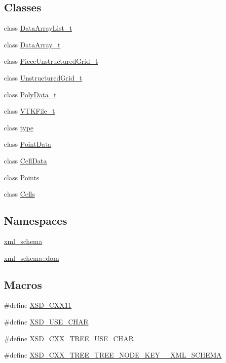 \subsection*{Classes}
\begin{DoxyCompactItemize}
\item 
class \hyperlink{classDataArrayList__t}{Data\+Array\+List\+\_\+t}
\item 
class \hyperlink{classDataArray__t}{Data\+Array\+\_\+t}
\item 
class \hyperlink{classPieceUnstructuredGrid__t}{Piece\+Unstructured\+Grid\+\_\+t}
\item 
class \hyperlink{classUnstructuredGrid__t}{Unstructured\+Grid\+\_\+t}
\item 
class \hyperlink{classPolyData__t}{Poly\+Data\+\_\+t}
\item 
class \hyperlink{classVTKFile__t}{V\+T\+K\+File\+\_\+t}
\item 
class \hyperlink{classtype}{type}
\item 
class \hyperlink{classPointData}{Point\+Data}
\item 
class \hyperlink{classCellData}{Cell\+Data}
\item 
class \hyperlink{classPoints}{Points}
\item 
class \hyperlink{classCells}{Cells}
\end{DoxyCompactItemize}
\subsection*{Namespaces}
\begin{DoxyCompactItemize}
\item 
 \hyperlink{namespacexml__schema}{xml\+\_\+schema}
\item 
 \hyperlink{namespacexml__schema_1_1dom}{xml\+\_\+schema\+::dom}
\end{DoxyCompactItemize}
\subsection*{Macros}
\begin{DoxyCompactItemize}
\item 
\#define \hyperlink{vtk-unstructured_8h_afcd897a3e49b8875ecf7c85beb33d39d}{X\+S\+D\+\_\+\+C\+X\+X11}
\item 
\#define \hyperlink{vtk-unstructured_8h_aee0a950eb1ff2461391d858c0cd254b7}{X\+S\+D\+\_\+\+U\+S\+E\+\_\+\+C\+H\+AR}
\item 
\#define \hyperlink{vtk-unstructured_8h_acef724a52414642ad3c9b7209702daf5}{X\+S\+D\+\_\+\+C\+X\+X\+\_\+\+T\+R\+E\+E\+\_\+\+U\+S\+E\+\_\+\+C\+H\+AR}
\item 
\#define \hyperlink{vtk-unstructured_8h_ab727c6f10de580ac0bb8f7395fa68895}{X\+S\+D\+\_\+\+C\+X\+X\+\_\+\+T\+R\+E\+E\+\_\+\+T\+R\+E\+E\+\_\+\+N\+O\+D\+E\+\_\+\+K\+E\+Y\+\_\+\+\_\+\+X\+M\+L\+\_\+\+S\+C\+H\+E\+MA}
\end{DoxyCompactItemize}
